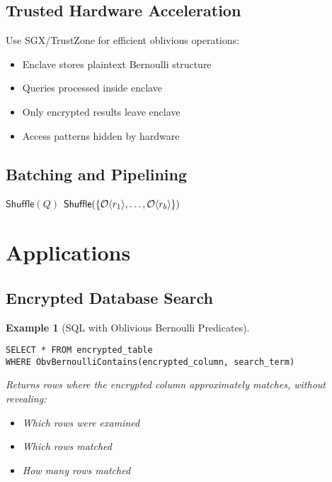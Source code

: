 \documentclass[11pt,final,hidelinks]{article}
\newtheorem{example}[theorem]{Example}
\begin{document}
\subsection{Trusted Hardware Acceleration}

Use SGX/TrustZone for efficient oblivious operations:
\begin{itemize}
    \item Enclave stores plaintext Bernoulli structure
    \item Queries processed inside enclave
    \item Only encrypted results leave enclave
    \item Access patterns hidden by hardware
\end{itemize}

\subsection{Batching and Pipelining}

\begin{algorithm}[H]
\caption{Batched Oblivious Queries}
$\mathsf{Shuffle}(Q)$ 
$\mathsf{Shuffle}(\{\mathcal{O}\langle r_1 \rangle, \ldots, \mathcal{O}\langle r_b \rangle\})$\;
\end{algorithm}

\section{Applications}

\subsection{Encrypted Database Search}

\begin{example}[SQL with Oblivious Bernoulli Predicates]
\begin{verbatim}
SELECT * FROM encrypted_table 
WHERE ObvBernoulliContains(encrypted_column, search_term)
\end{verbatim}
Returns rows where the encrypted column approximately matches, without revealing:
\begin{itemize}
    \item Which rows were examined
    \item Which rows matched
    \item How many rows matched
\end{itemize}
\end{example}
\end{document}
